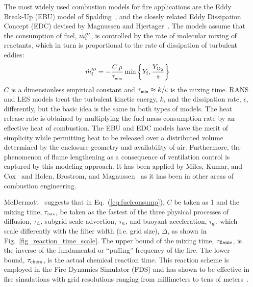 \documentclass[graybox]{svmult}
\begin{document}
The most widely used combustion models for fire applications are the Eddy Break-Up (EBU) model of Spalding~\cite{Spalding:1971}, and the closely related Eddy Dissipation Concept (EDC) devised by Magnussen and Hjertager~\cite{Magnussen}. The models assume that the consumption of fuel, $\dot{m}_{\rm f}'''$, is controlled by the rate of molecular mixing of reactants, which in turn is proportional to the rate of dissipation of turbulent eddies:
\begin{equation}
\dot{m}_{\rm f}''' = - \frac{C \, \rho}{\tau_{\hbox{\tiny mix}}} \min \left\{ Y_{\rm f}, \frac{Y_{\mathrm{O_2}}}{s} \right\}
\label{eq:fuelconsump}
\end{equation}
$C$ is a dimensionless empirical constant and $\tau_{\hbox{\tiny mix}} \approx k/\epsilon$ is the mixing time. RANS and LES models treat the turbulent kinetic energy, $k$, and the dissipation rate, $\epsilon$, differently, but the basic idea is the same in both types of models. The heat release rate is obtained by multiplying the fuel mass consumption rate by an effective heat of combustion. The EBU and EDC models have the merit of simplicity while permitting heat to be released over a distributed volume determined by the enclosure geometry and availability of air. Furthermore, the phenomenon of flame lengthening as a consequence of ventilation control is captured by this modeling approach. It has been applied by Miles, Kumar, and Cox~\cite{Miles} and Holen, Brostrom, and Magnussen~\cite{Holen} as it has been in other areas of combustion engineering.

McDermott~\cite{McDermott:2011} suggests that in Eq.~(\ref{eq:fuelconsump}), $C$ be taken as 1 and the mixing time, $\tau_{\hbox{\tiny mix}}$, be taken as the fastest of the three physical processes of diffusion, $\tau_{\rm d}$, subgrid-scale advection, $\tau_{\rm u}$, and buoyant acceleration, $\tau_{\rm g}$, which scale differently with the filter width (i.e. grid size), $\Delta$, as shown in Fig.~\ref{fig_reaction_time_scale}. The upper bound of the mixing time, $\tau_{\rm flame}$, is the inverse of the fundamental or ``puffing'' frequency of the fire. The lower bound, $\tau_{\rm chem}$, is the actual chemical reaction time. This reaction scheme is employed in the Fire Dynamics Simulator (FDS) and has shown to be effective in fire simulations with grid resolutions ranging from millimeters to tens of meters~\cite{FDS_Validation_Guide}.
\end{document}

